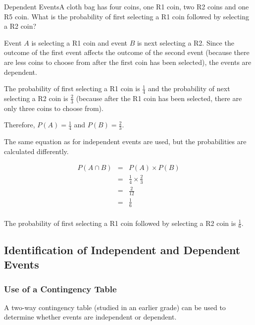 \begin{wex}{Dependent Events}{A cloth bag has four coins, one R1 coin, two R2 coins and one R5 coin. What is the probability of first selecting a R1 coin followed by selecting a R2 coin?}{

Event $A$ is selecting a R1 coin and event $B$ is next selecting a R2. Since the outcome of the first event affects the outcome of the second event (because there are less coins to choose from after the first coin has been selected), the events are dependent.


The probability of first selecting a R1 coin is $\frac{1}{4}$ and the probability of next selecting a R2 coin is $\frac{2}{3}$ (because after the R1 coin has been selected, there are only three coins to choose from).

Therefore, $P(A)=\frac{1}{4}$ and $P(B)=\frac{2}{3}$.


The same equation as for independent events are used, but the probabilities are calculated differently.

\begin{eqnarray*}
P(A \cap B) &=& P(A)\times P(B)\\
&=&\frac{1}{4} \times \frac{2}{3}\\
&=&\frac{2}{12}\\
&=&\frac{1}{6}\\
\end{eqnarray*}

The probability of first selecting a R1 coin followed by selecting a R2 coin is $\frac{1}{6}$.}
\end{wex}

\subsection{Identification of Independent and Dependent Events}
\subsubsection{Use of a Contingency Table}
A two-way contingency table (studied in an earlier grade) can be used to determine whether events are independent or dependent.

